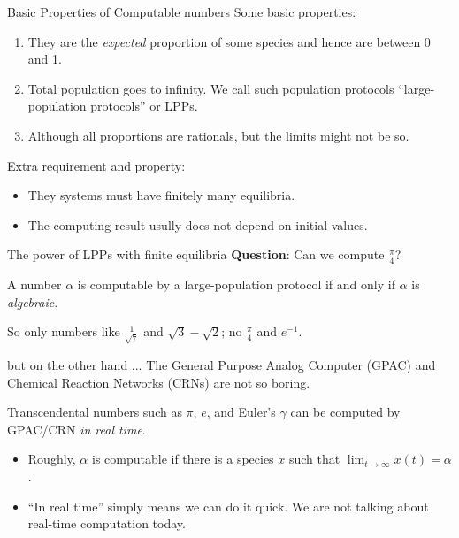 \documentclass[aspectratio=169]{beamer}
\begin{document}
\begin{frame}{Basic Properties of Computable numbers}
Some basic properties:
\begin{enumerate}
    \item They are the \emph{expected} proportion of some species and hence are between 0 and 1.
    \item Total population goes to infinity. We call such population protocols ``large-population protocols'' or LPPs.
    \item Although all proportions are rationals, but the limits might not be so.
\end{enumerate} \pause
Extra requirement and property:
\begin{itemize}
    \item They systems must have finitely many equilibria.
    \item The computing result usully does not depend on initial values.
\end{itemize}

\end{frame}

\begin{frame}[Clean]{The power of LPPs with finite equilibria}
    \textbf{Question}: Can we compute $\frac{\pi}{4}$?
\pause
\begin{theorem}
A number $\alpha$ is computable by a large-population protocol if and only if $\alpha$ is \emph{algebraic}.
\end{theorem}
\pause
So only numbers like  $\frac{1}{\sqrt{7}}$ and $\sqrt{3}-\sqrt{2}$; no $\frac{\pi}{4}$ and $e^{-1}$.
\end{frame}

\begin{frame}{but on the other hand ...}%
The General Purpose Analog Computer (GPAC) and Chemical Reaction Networks (CRNs) are not so boring.

\begin{theorem}
    Transcendental numbers such as $\pi$, $e$, and Euler's $\gamma$ can be computed by GPAC/CRN \emph{in real time}.
\end{theorem}
\begin{itemize}
    \item Roughly, $\alpha$ is computable if there is a species $x$ such that $\lim_{t\to \infty} x(t)=\alpha$.
    \item ``In real time'' simply means we can do it quick. We are not talking about real-time computation today.
\end{itemize}
\end{frame}
\end{document}
